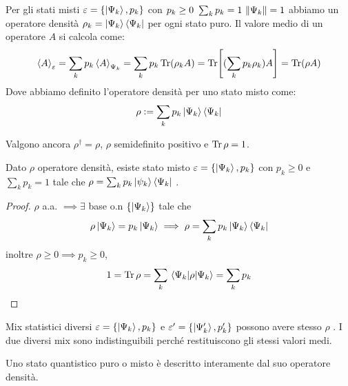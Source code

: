 Per gli stati misti \( \varepsilon = \left\{ \ket{\Psi_k}, p_k \right\}\) con \(p_k \geq0  \ \sum_k p_k= 1 \ \norm{\Psi_k}= 1\) abbiamo un operatore densità \(\rho_k = \ket{\Psi_k}\bra{\Psi_k}\) per ogni stato puro.
Il valore medio di un operatore \(A\) si calcola come:
\begin{equation}
    \expval{A}_\varepsilon = \sum_k p_k \expval{A}_{\Psi_k} = \sum_k  p_k \Tr(\rho_k A)= \Tr[(\sum_k p_k\rho_k)A] = \Tr(\rho A)
\end{equation}
Dove abbiamo definito l'operatore densità per uno stato misto come:
\begin{equation}
    \rho : = \sum_k  p_k\ket{\Psi_k}\bra{\Psi_k}    
\end{equation}

Valgono ancora \(\rho^\dagger = \rho\), \(\rho\) semidefinito positivo e \(\Tr \rho = 1\).

\begin{theorem}
    Dato \(\rho\) operatore densità, esiste stato misto \(\varepsilon = \left\{ \ket{\Psi_k}, p_k \right\}\) con \(p_k \geq 0 \) e \(\sum_k p_k =1\) tale che 
    \(\rho = \sum_k p_k \ket{\psi_k}\bra{\Psi_k}\) .
\end{theorem}
\begin{proof}
    \(\rho\) a.a. \(\implies  \exists\) base o.n \(\left\{\ket{\Psi_k}\right\}\) tale che 
    \[\rho\ket{\Psi_k}= p_k\ket{\Psi_k} \implies \rho = \sum_k p_k \ket{\Psi_k}\bra{\Psi_k}\]
    inoltre \(\rho\geq0 \implies p_k \geq 0\),
    \[
        1 = \Tr \rho = \sum_k \expval{\rho}{\Psi_k} = \sum_k    p_k
    \]
    
\end{proof}


\begin{remark}
    Mix statistici diversi \( \varepsilon = \left\{ \ket{\Psi_k}, p_k  \right\}\) e \( \varepsilon' = \left\{ \ket{\Psi'_k}, p'_k  \right\}\) possono avere stesso \(\rho\) .
    I due diversi mix sono indistinguibili perché restituiscono gli stessi valori medi.
\end{remark}
Uno stato quantistico puro o misto è descritto interamente dal suo operatore densità.

